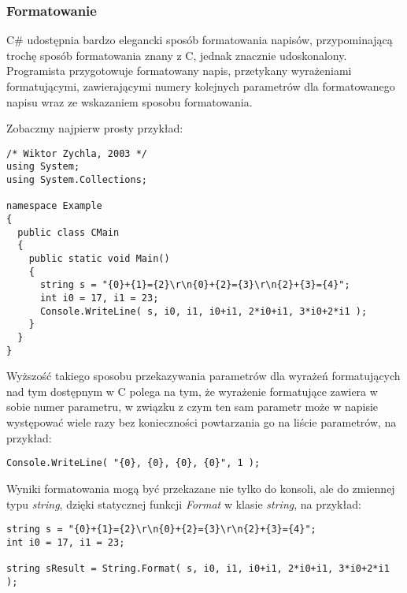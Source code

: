 \subsubsection{Formatowanie}

C\# udostępnia bardzo elegancki sposób formatowania napisów, przypominającą trochę sposób formatowania
znany z C, jednak znacznie udoskonalony. Programista przygotowuje formatowany napis, przetykany wyrażeniami
formatującymi, zawierającymi numery kolejnych parametrów dla formatowanego napisu wraz ze wskazaniem
sposobu formatowania.

Zobaczmy najpierw prosty przykład:

\begin{scriptsize}
\begin{verbatim}
/* Wiktor Zychla, 2003 */
using System;
using System.Collections;

namespace Example
{ 
  public class CMain
  {    
    public static void Main()
    {
      string s = "{0}+{1}={2}\r\n{0}+{2}={3}\r\n{2}+{3}={4}";
      int i0 = 17, i1 = 23;	
      Console.WriteLine( s, i0, i1, i0+i1, 2*i0+i1, 3*i0+2*i1 );
    }
  }
}
\end{verbatim}
\end{scriptsize}

Wyższość takiego sposobu przekazywania parametrów dla wyrażeń formatujących nad tym dostępnym w C polega na tym,
że wyrażenie formatujące zawiera w sobie numer parametru, w związku z czym ten sam parametr może w napisie
występować wiele razy bez konieczności powtarzania go na liście parametrów, na przykład:

\begin{scriptsize}
\begin{verbatim}
Console.WriteLine( "{0}, {0}, {0}, {0}", 1 );
\end{verbatim}
\end{scriptsize}

Wyniki formatowania mogą być przekazane nie tylko do konsoli, ale do zmiennej typu {\em string}, dzięki
statycznej funkcji {\em Format} w klasie {\em string}, na przykład:

\begin{scriptsize}
\begin{verbatim}
string s = "{0}+{1}={2}\r\n{0}+{2}={3}\r\n{2}+{3}={4}";
int i0 = 17, i1 = 23;	

string sResult = String.Format( s, i0, i1, i0+i1, 2*i0+i1, 3*i0+2*i1 );
\end{verbatim}
\end{scriptsize}

